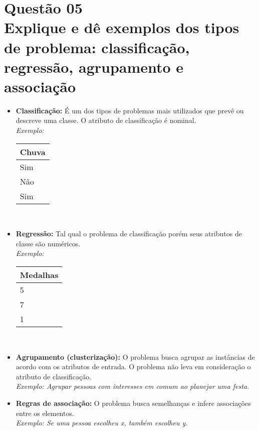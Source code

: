 \documentclass[12pt]{article}
\begin{document}
\section{Questão 05\\
Explique e dê exemplos dos tipos de problema: classificação, regressão, agrupamento e associação
}
\begin{itemize}
    \item \textbf{Classificação:} É um dos tipos de problemas mais utilizados que prevê ou descreve uma classe.
    O atributo de classificação é nominal.\\ 
    \textit{Exemplo:}\\

        \begin{tabular}{ l }
            \textbf{Chuva}\\
            \hline
          Sim \\ \hline
          Não \\ \hline
          Sim \\
          \hline
        \end{tabular}\\

    \item \textbf{Regressão:}
    Tal qual o problema de classificação porém seus atributos de classe são numéricos.\\
    \textit{Exemplo:}\\

    \begin{tabular}{ l }
        \textbf{Medalhas}\\
        \hline
      5 \\ \hline
      7 \\ \hline
      1 \\
      \hline
    \end{tabular}\\
    \item \textbf{Agrupamento (clusterização):}
    O problema busca agrupar as instâncias de acordo com os atributos de entrada.
    O problema não leva em consideração o atributo de classificação.\\
    \textit{Exemplo: Agrupar pessoas com interesses em comum ao planejar uma festa.}
    \item \textbf{Regras de associação:}
    O problema busca semelhanças e infere associações entre os elementos.\\
    \textit{Exemplo: Se uma pessoa escolheu x, também escolheu y.}

\end{itemize}
\end{document}
